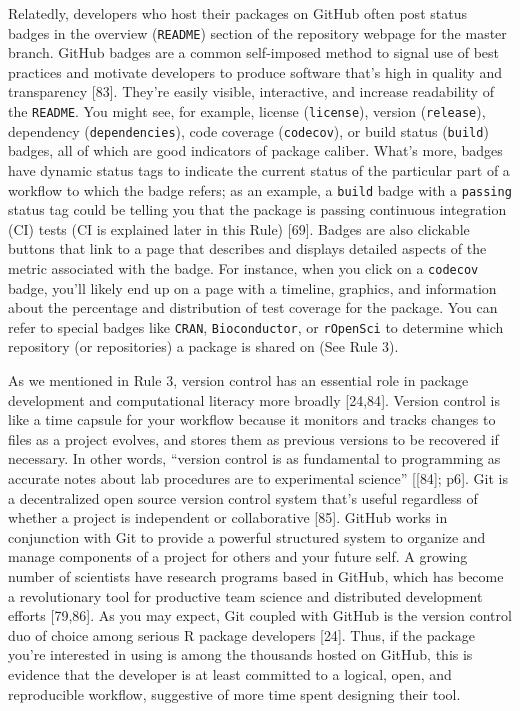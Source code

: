 \documentclass[10pt,letterpaper]{article}
\begin{document}
Relatedly, developers who host their packages on GitHub often post
status badges in the overview (\texttt{README}) section of the
repository webpage for the master branch. GitHub badges are a common
self-imposed method to signal use of best practices and motivate
developers to produce software that's high in quality and transparency
{[}83{]}. They're easily visible, interactive, and increase readability
of the \texttt{README}. You might see, for example, license
(\texttt{license}), version (\texttt{release}), dependency
(\texttt{dependencies}), code coverage (\texttt{codecov}), or build
status (\texttt{build}) badges, all of which are good indicators of
package caliber. What's more, badges have dynamic status tags to
indicate the current status of the particular part of a workflow to
which the badge refers; as an example, a \texttt{build} badge with a
\texttt{passing} status tag could be telling you that the package is
passing continuous integration (CI) tests (CI is explained later in this
Rule) {[}69{]}. Badges are also clickable buttons that link to a page
that describes and displays detailed aspects of the metric associated
with the badge. For instance, when you click on a \texttt{codecov}
badge, you'll likely end up on a page with a timeline, graphics, and
information about the percentage and distribution of test coverage for
the package. You can refer to special badges like \texttt{CRAN},
\texttt{Bioconductor}, or \texttt{rOpenSci} to determine which
repository (or repositories) a package is shared on (See Rule 3).

As we mentioned in Rule 3, version control has an essential role in
package development and computational literacy more broadly {[}24,84{]}.
Version control is like a time capsule for your workflow because it
monitors and tracks changes to files as a project evolves, and stores
them as previous versions to be recovered if necessary. In other words,
``version control is as fundamental to programming as accurate notes
about lab procedures are to experimental science'' {[}{[}84{]}; p6{]}.
Git is a decentralized open source version control system that's useful
regardless of whether a project is independent or collaborative
{[}85{]}. GitHub works in conjunction with Git to provide a powerful
structured system to organize and manage components of a project for
others and your future self. A growing number of scientists have
research programs based in GitHub, which has become a revolutionary tool
for productive team science and distributed development efforts
{[}79,86{]}. As you may expect, Git coupled with GitHub is the version
control duo of choice among serious R package developers {[}24{]}. Thus,
if the package you're interested in using is among the thousands hosted
on GitHub, this is evidence that the developer is at least committed to
a logical, open, and reproducible workflow, suggestive of more time
spent designing their tool.
\end{document}
